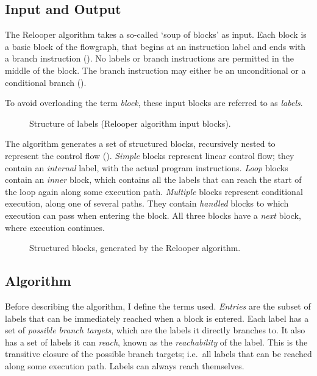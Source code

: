 \documentclass[00-main.tex]{subfiles}
\begin{document}
\subsection{Input and Output}

The Relooper algorithm takes a so-called `soup of blocks' as input.
Each block is a basic block of the flowgraph, that begins at an instruction label and ends with a branch instruction ().
No labels or branch instructions are permitted in the middle of the block.
The branch instruction may either be an unconditional or a conditional branch ().

To avoid overloading the term \emph{block}, these input blocks are referred to as \emph{labels}.


\begin{figure}[t]
  \centering
  \caption{Structure of labels (Relooper algorithm input blocks).}
  \label{fig:relooper input label structure} %
\end{figure}

The algorithm generates a set of structured blocks, recursively nested to represent the control flow ().
\emph{Simple} blocks represent linear control flow; they contain an \emph{internal} label, with the actual program instructions.
\emph{Loop} blocks contain an \emph{inner} block, which contains all the labels that can reach the start of the loop again along some execution path.
\emph{Multiple} blocks represent conditional execution, along one of several paths.
They contain \emph{handled} blocks to which execution can pass when entering the block.
All three blocks have a \emph{next} block, where execution continues.

\begin{figure}[t]
  \centering
  \caption{Structured blocks, generated by the Relooper algorithm.}
  \label{fig:relooper output blocks structure} %
\end{figure}

\subsection{Algorithm}\label{sec:prep:relooper algorithm}

Before describing the algorithm, I define the terms used.
\emph{Entries} are the subset of labels that can be immediately reached when a block is entered.
Each label has a set of \emph{possible branch targets}, which are the labels it directly branches to.
It also has a set of labels it can \emph{reach}, known as the \emph{reachability} of the label.
This is the transitive closure of the possible branch targets; i.e.\ all labels that can be reached along some execution path.
Labels can always reach themselves.
\end{document}
